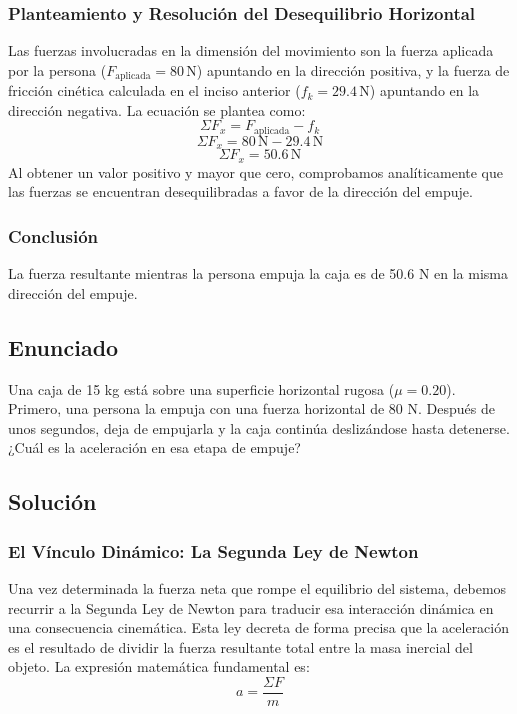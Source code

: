 \documentclass[12pt]{article}
\begin{document}
\subsubsection*{Planteamiento y Resolución del Desequilibrio Horizontal}
Las fuerzas involucradas en la dimensión del movimiento son la fuerza aplicada por la persona ($F_{\text{aplicada}} = 80 \, \text{N}$) apuntando en la dirección positiva, y la fuerza de fricción cinética calculada en el inciso anterior ($f_k = 29.4 \, \text{N}$) apuntando en la dirección negativa. La ecuación se plantea como:
\begin{equation}
    \Sigma F_x = F_{\text{aplicada}} - f_k
\end{equation}
\begin{equation}
    \Sigma F_x = 80 \, \text{N} - 29.4 \, \text{N}
\end{equation}
\begin{equation}
    \Sigma F_x = 50.6 \, \text{N}
\end{equation}
Al obtener un valor positivo y mayor que cero, comprobamos analíticamente que las fuerzas se encuentran desequilibradas a favor de la dirección del empuje.

\subsubsection*{Conclusión}
La fuerza resultante mientras la persona empuja la caja es de 50.6 N en la misma dirección del empuje.

\newpage

\subsection*{Enunciado}
Una caja de 15 kg está sobre una superficie horizontal rugosa ($\mu = 0.20$). Primero, una persona la empuja con una fuerza horizontal de 80 N. Después de unos segundos, deja de empujarla y la caja continúa deslizándose hasta detenerse. ¿Cuál es la aceleración en esa etapa de empuje?

\subsection*{Solución}

\subsubsection*{El Vínculo Dinámico: La Segunda Ley de Newton}
Una vez determinada la fuerza neta que rompe el equilibrio del sistema, debemos recurrir a la Segunda Ley de Newton para traducir esa interacción dinámica en una consecuencia cinemática. Esta ley decreta de forma precisa que la aceleración es el resultado de dividir la fuerza resultante total entre la masa inercial del objeto. La expresión matemática fundamental es:
\begin{equation}
    a = \frac{\Sigma F}{m}
\end{equation}
\end{document}
